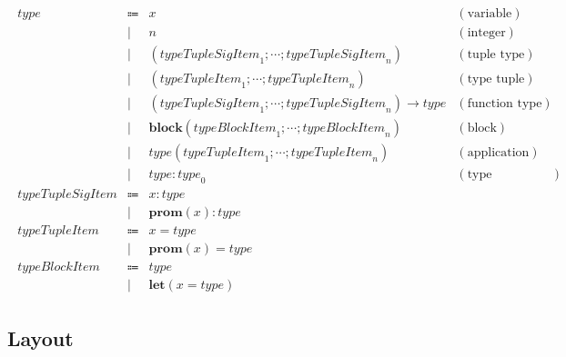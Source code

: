 \begin{align*}
  \begin{array}{rclr}
  \mathit{type}
  & \Coloneq & x &(\text{variable}) \\
  & \mid & n &(\text{integer}) \\
  & \mid & (\mathit{typeTupleSigItem}_1; \cdots; \mathit{typeTupleSigItem}_n) &(\text{tuple type}) \\
  & \mid & (\mathit{typeTupleItem}_1; \cdots; \mathit{typeTupleItem}_n) &(\text{type tuple}) \\
  & \mid & (\mathit{typeTupleSigItem}_1; \cdots; \mathit{typeTupleSigItem}_n) \rightarrow \mathit{type} &(\text{function type}) \\
  & \mid & \mathbf{block}(\mathit{typeBlockItem}_1; \cdots; \mathit{typeBlockItem}_n) &(\text{block}) \\
  & \mid & \mathit{type}(\mathit{typeTupleItem}_1; \cdots; \mathit{typeTupleItem}_n) &(\text{application}) \\
  & \mid & \mathit{type}: \mathit{type}_0 &(\text{type annotation}) \\
  \mathit{typeTupleSigItem}
  & \Coloneq & x: \mathit{type} \\
  & \mid & \mathbf{prom}(x): \mathit{type} \\
  \mathit{typeTupleItem}
  & \Coloneq & x = \mathit{type} \\
  & \mid & \mathbf{prom}(x) = \mathit{type} \\
  \mathit{typeBlockItem}
  & \Coloneq & \mathit{type} \\
  & \mid & \mathbf{let}(x = \mathit{type})
  \end{array}
\end{align*}

\subsection{Layout}
